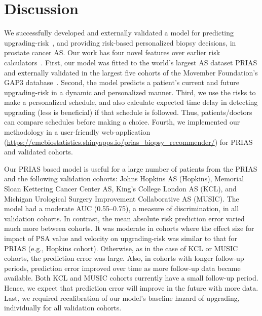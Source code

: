 \section{Discussion}
We successfully developed and externally validated a model for predicting upgrading-risk~\citep{bruinsma2017expert}, and providing risk-based personalized biopsy decisions, in prostate cancer AS.
Our work has four novel features over earlier risk calculators~\citep{coley2017prediction,ankerst2015precision}. First, our model was fitted to the world's largest AS dataset PRIAS and externally validated in the largest five cohorts of the Movember Foundation's GAP3 database~\citep{gap3_2018}. Second, the model predicts a patient's current and future upgrading-risk in a dynamic and personalized manner. Third, we use the risks to make a personalized schedule, and also calculate expected time delay in detecting upgrading (less is beneficial) if that schedule is followed. Thus, patients/doctors can compare schedules before making a choice. Fourth, we implemented our methodology in a user-friendly web-application (\url{https://emcbiostatistics.shinyapps.io/prias_biopsy_recommender/}) for PRIAS and validated cohorts.

Our PRIAS based model is useful for a large number of patients from the PRIAS and the following validation cohorts: Johns Hopkins AS (Hopkins), Memorial Sloan Kettering Cancer Center AS, King's College London AS (KCL), and Michigan Urological Surgery Improvement Collaborative AS (MUSIC). The model had a moderate AUC (0.55--0.75), a measure of discrimination, in all validation cohorts. In contrast, the mean absolute risk prediction error varied much more between cohorts. It was moderate in cohorts where the effect size for impact of PSA value and velocity on upgrading-risk was similar to that for PRIAS (e.g., Hopkins cohort). Otherwise, as in the case of KCL or MUSIC cohorts, the prediction error was large. Also, in cohorts with longer follow-up periods, prediction error improved over time as more follow-up data became available. Both KCL and MUSIC cohorts currently have a small follow-up period. Hence, we expect that prediction error will improve in the future with more data. Last, we required recalibration of our model's baseline hazard of upgrading, individually for all validation cohorts.

